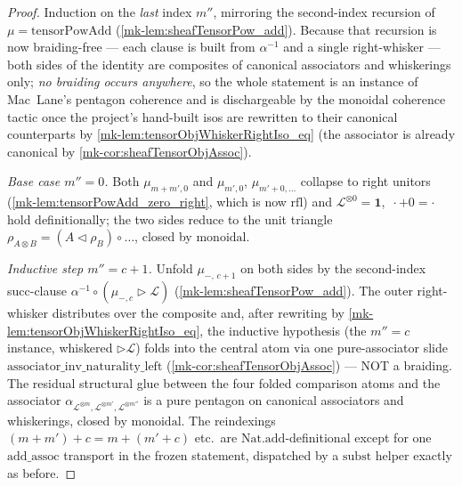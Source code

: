\begin{proof}
  Induction on the \emph{last} index \(m''\), mirroring the second-index recursion
  of \(\mu = \mathrm{tensorPowAdd}\) (\ref{mk-lem:sheafTensorPow_add}). Because that
  recursion is now braiding-free --- each clause is built from \(\alpha^{-1}\) and a
  single right-whisker --- both sides of the identity are composites of canonical
  associators and whiskerings only; \emph{no braiding occurs anywhere}, so the whole
  statement is an instance of Mac~Lane's pentagon coherence and is dischargeable by
  the \(\mathrm{monoidal}\) coherence tactic once the project's hand-built isos are
  rewritten to their canonical counterparts by \ref{mk-lem:tensorObjWhiskerRightIso_eq}
  (the associator is already canonical by \ref{mk-cor:sheafTensorObjAssoc}).

  \emph{Base case \(m'' = 0\).} Both \(\mu_{m+m',0}\) and \(\mu_{m',0}\),
  \(\mu_{m'+0,\dots}\) collapse to right unitors (\ref{mk-lem:tensorPowAdd_zero_right},
  which is now \(\mathrm{rfl}\)) and \(\mathcal{L}^{\otimes 0} = \mathbf{1}\), \(\,\cdot
  + 0 = \cdot\) hold definitionally; the two sides reduce to the unit triangle
  \(\rho_{A\otimes B} = (A \lhd \rho_B)\circ\dots\), closed by \(\mathrm{monoidal}\).

  \emph{Inductive step \(m'' = c+1\).} Unfold \(\mu_{-,\,c+1}\) on both sides by the
  second-index succ-clause \(\alpha^{-1}\circ(\mu_{-,c}\rhd\mathcal{L})\)
  (\ref{mk-lem:sheafTensorPow_add}). The outer right-whisker distributes over the
  composite and, after rewriting by \ref{mk-lem:tensorObjWhiskerRightIso_eq}, the
  inductive hypothesis (the \(m''=c\) instance, whiskered \(\rhd\mathcal{L}\)) folds
  into the central atom via one pure-associator slide
  \(\mathrm{associator\_inv\_naturality\_left}\) (\ref{mk-cor:sheafTensorObjAssoc}) ---
  NOT a braiding. The residual structural glue between the four folded comparison
  atoms and the associator \(\alpha_{\mathcal{L}^{\otimes m},\mathcal{L}^{\otimes
  m'},\mathcal{L}^{\otimes m''}}\) is a pure pentagon on canonical associators and
  whiskerings, closed by \(\mathrm{monoidal}\). The reindexings \((m+m')+c =
  m+(m'+c)\) etc.\ are \(\mathrm{Nat.add}\)-definitional except for one
  \(\mathrm{add\_assoc}\) transport in the frozen statement, dispatched by a
  \(\mathrm{subst}\) helper exactly as before.
\end{proof}

